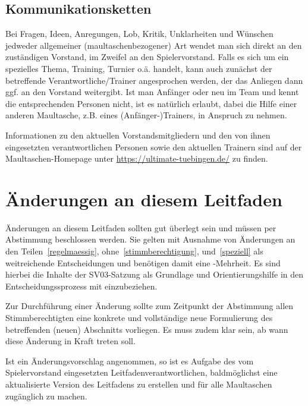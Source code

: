\documentclass[a4 paper, 11pt]{article}
\begin{document}
\subsection{Kommunikationsketten}
Bei Fragen, Ideen, Anregungen, Lob, Kritik, Unklarheiten und Wünschen jedweder allgemeiner (maultaschenbezogener) Art wendet man sich direkt an den zuständigen Vorstand, im Zweifel an den Spielervorstand. Falls es sich um ein spezielles Thema, Training, Turnier o.ä. handelt, kann auch zunächst der betreffende Verantwortliche/Trainer angesprochen werden, der das Anliegen dann ggf. an den Vorstand weitergibt. Ist man Anfänger oder neu im Team und kennt die entsprechenden Personen nicht, ist es natürlich erlaubt, dabei die Hilfe einer anderen Maultasche, z.B. eines (Anfänger-)Trainers, in Anspruch zu nehmen. 

Informationen zu den aktuellen Vorstandsmitgliedern und den von ihnen eingesetzten verantwortlichen Personen sowie den aktuellen Trainern sind auf der Maultaschen-Homepage unter \url{https://ultimate-tuebingen.de/} zu finden.


\section{Änderungen an diesem Leitfaden}
Änderungen an diesem Leitfaden sollten gut überlegt sein und müssen per Abstimmung 
beschlossen werden. Sie gelten mit Ausnahme von Änderungen an den Teilen~\ref{regelmaessig}, ohne~\ref{stimmberechtigung}, und~\ref{speziell} als weitreichende Entscheidungen und benötigen damit eine -Mehrheit.
Es sind hierbei die Inhalte der SV03-Satzung als Grundlage und Orientierungshilfe in den Entscheidungssprozess mit einzubeziehen.

Zur Durchführung einer Änderung sollte zum Zeitpunkt der Abstimmung allen Stimmberechtigten eine konkrete und vollständige neue Formulierung des betreffenden (neuen) Abschnitts vorliegen. Es muss zudem klar sein, ab wann diese Änderung in Kraft treten soll.

Ist ein Änderungsvorschlag angenommen, so ist es Aufgabe des vom Spielervorstand eingesetzten Leitfadenverantwortlichen, baldmöglichst eine aktualisierte Version des Leitfadens zu erstellen und für alle Maultaschen zugänglich zu machen.
\end{document}
